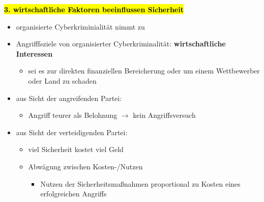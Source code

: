 \documentclass[a4paper, 10pt]{article}
\begin{document}
\noindent\textbf{\hl{3. wirtschaftliche Faktoren beeinflussen Sicherheit}}
\begin{itemize}
    \item organisierte Cyberkriminialität nimmt zu
    \item Angrifffsziele von organisierter Cyberkriminalität: \textbf{wirtschaftliche Interessen}
    \begin{itemize}
        \item sei es zur direkten finanziellen Bereicherung oder um einem Wettbewerber oder Land zu schaden
    \end{itemize}
    \item aus Sicht der angreifenden Partei:
    \begin{itemize}
        \item Angriff teurer als Belohnung $\longrightarrow$ kein Angriffsversuch
    \end{itemize}
    \item aus Sicht der verteidigenden Partei:
    \begin{itemize}
        \item viel Sicherheit kostet viel Geld
        \item Abwägung zwischen Kosten-/Nutzen 
        \begin{itemize}
            \item Nutzen der Sicherheitsmaßnahmen proportional zu Kosten eines erfolgreichen Angriffs
        \end{itemize}
    \end{itemize}
\end{itemize}
\end{document}
